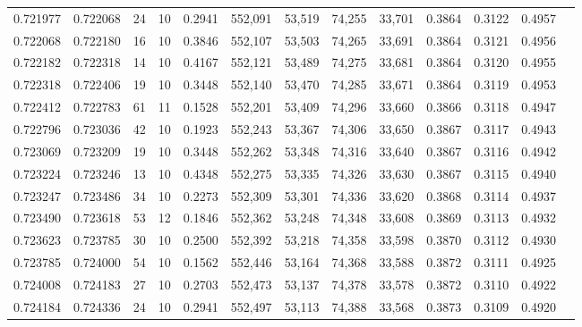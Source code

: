 \begin{tabular}{rrrrrrrrrrrrr}
0.721977 & 0.722068 &    24 &  10 &                                     0.2941 & 552,091 &  53,519 &  74,255 &  33,701 & 0.3864 & 0.3122 & 0.4957 \\
0.722068 & 0.722180 &    16 &  10 &                                     0.3846 & 552,107 &  53,503 &  74,265 &  33,691 & 0.3864 & 0.3121 & 0.4956 \\
0.722182 & 0.722318 &    14 &  10 &                                     0.4167 & 552,121 &  53,489 &  74,275 &  33,681 & 0.3864 & 0.3120 & 0.4955 \\
0.722318 & 0.722406 &    19 &  10 &                                     0.3448 & 552,140 &  53,470 &  74,285 &  33,671 & 0.3864 & 0.3119 & 0.4953 \\
0.722412 & 0.722783 &    61 &  11 &                                     0.1528 & 552,201 &  53,409 &  74,296 &  33,660 & 0.3866 & 0.3118 & 0.4947 \\
0.722796 & 0.723036 &    42 &  10 &                                     0.1923 & 552,243 &  53,367 &  74,306 &  33,650 & 0.3867 & 0.3117 & 0.4943 \\
0.723069 & 0.723209 &    19 &  10 &                                     0.3448 & 552,262 &  53,348 &  74,316 &  33,640 & 0.3867 & 0.3116 & 0.4942 \\
0.723224 & 0.723246 &    13 &  10 &                                     0.4348 & 552,275 &  53,335 &  74,326 &  33,630 & 0.3867 & 0.3115 & 0.4940 \\
0.723247 & 0.723486 &    34 &  10 &                                     0.2273 & 552,309 &  53,301 &  74,336 &  33,620 & 0.3868 & 0.3114 & 0.4937 \\
0.723490 & 0.723618 &    53 &  12 &                                     0.1846 & 552,362 &  53,248 &  74,348 &  33,608 & 0.3869 & 0.3113 & 0.4932 \\
0.723623 & 0.723785 &    30 &  10 &                                     0.2500 & 552,392 &  53,218 &  74,358 &  33,598 & 0.3870 & 0.3112 & 0.4930 \\
0.723785 & 0.724000 &    54 &  10 &                                     0.1562 & 552,446 &  53,164 &  74,368 &  33,588 & 0.3872 & 0.3111 & 0.4925 \\
0.724008 & 0.724183 &    27 &  10 &                                     0.2703 & 552,473 &  53,137 &  74,378 &  33,578 & 0.3872 & 0.3110 & 0.4922 \\
0.724184 & 0.724336 &    24 &  10 &                                     0.2941 & 552,497 &  53,113 &  74,388 &  33,568 & 0.3873 & 0.3109 & 0.4920 \\

\end{tabular}
